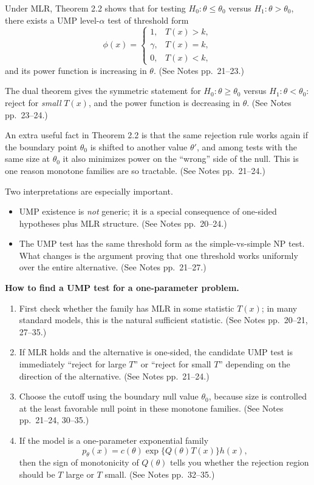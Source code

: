 Under MLR, Theorem 2.2 shows that for testing $H_0:\theta \le \theta_0$ versus $H_1:\theta > \theta_0$, there exists a UMP level-$\alpha$ test of threshold form
\[
\phi(x)=
\begin{cases}
1, & T(x) > k,\\
\gamma, & T(x) = k,\\
0, & T(x) < k,
\end{cases}
\]
and its power function is increasing in $\theta$. (See Notes pp.~21--23.)

The dual theorem gives the symmetric statement for $H_0:\theta \ge \theta_0$ versus $H_1:\theta < \theta_0$: reject for \emph{small} $T(x)$, and the power function is decreasing in $\theta$. (See Notes pp.~23--24.)

An extra useful fact in Theorem 2.2 is that the same rejection rule works again if the boundary point $\theta_0$ is shifted to another value $\theta'$, and among tests with the same size at $\theta_0$ it also minimizes power on the ``wrong'' side of the null. This is one reason monotone families are so tractable. (See Notes pp.~21--24.)

Two interpretations are especially important.
\begin{itemize}
    \item UMP existence is \emph{not} generic; it is a special consequence of one-sided hypotheses plus MLR structure. (See Notes pp.~20--24.)
    \item The UMP test has the same threshold form as the simple-vs-simple NP test. What changes is the argument proving that one threshold works uniformly over the entire alternative. (See Notes pp.~21--27.)
\end{itemize}

\begin{mybox}
\textbf{How to find a UMP test for a one-parameter problem.}
\begin{enumerate}
    \item First check whether the family has MLR in some statistic $T(x)$; in many standard models, this is the natural sufficient statistic. (See Notes pp.~20--21, 27--35.)
    \item If MLR holds and the alternative is one-sided, the candidate UMP test is immediately ``reject for large $T$'' or ``reject for small $T$'' depending on the direction of the alternative. (See Notes pp.~21--24.)
    \item Choose the cutoff using the boundary null value $\theta_0$, because size is controlled at the least favorable null point in these monotone families. (See Notes pp.~21--24, 30--35.)
    \item If the model is a one-parameter exponential family
    \[
    p_\theta(x)=c(\theta)\exp\{Q(\theta)T(x)\}h(x),
    \]
    then the sign of monotonicity of $Q(\theta)$ tells you whether the rejection region should be $T$ large or $T$ small. (See Notes pp.~32--35.)
\end{enumerate}
\end{mybox}

